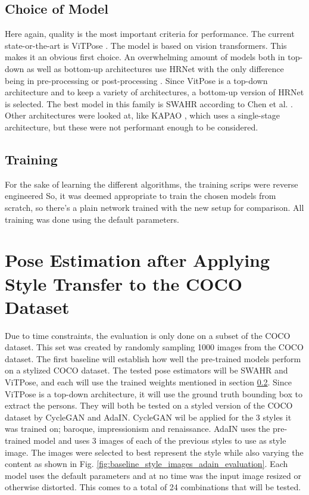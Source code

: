 \subsection{Choice of Model}
\label{sec:baseline_choice_pose_estimation}
Here again, quality is the most important criteria for performance.
The current state-or-the-art is ViTPose \cite{xu2023}.
The model is based on vision transformers.
This makes it an obvious first choice.
An overwhelming amount of models both in top-down as well as bottom-up architectures use HRNet \cite{Sun2019} with the only difference being in pre-processing \cite{Zhang2019} \cite{Huang2019} or post-processing \cite{Cheng2019} \cite{Geng2021}.
Since VitPose is a top-down architecture and to keep a variety of architectures, a bottom-up version of HRNet is selected.
The best model in this family is SWAHR according to Chen et al. \cite{chen2022}.
Other architectures were looked at, like KAPAO \cite{William2021}, which uses a single-stage architecture, but these were not performant enough to be considered.

\subsection{Training}
\label{sec:baseline_training_pose_estimation}
For the sake of learning the different algorithms, the training scrips were reverse engineered
So, it was deemed appropriate to train the chosen models from scratch, so there's a plain network trained with the new setup for comparison.
All training was done using the default parameters.

\section{Pose Estimation after Applying Style Transfer to the COCO Dataset}
\label{sec:baseline_coco_style_transfer}
Due to time constraints, the evaluation is only done on a subset of the COCO dataset.
This set was created by randomly sampling 1000 images from the COCO dataset.
The first baseline will establish how well the pre-trained models perform on a stylized COCO dataset.
The tested pose estimators will be SWAHR and ViTPose, and each will use the trained weights mentioned in section \ref{sec:baseline_training_pose_estimation}.
Since ViTPose is a top-down architecture, it will use the ground truth bounding box to extract the persons.
They will both be tested on a styled version of the COCO dataset by CycleGAN and AdaIN.
CycleGAN wil be applied for the 3 styles it was trained on; baroque, impressionism and renaissance.
AdaIN uses the pre-trained model and uses 3 images of each of the previous styles to use as style image.
The images were selected to best represent the style while also varying the content as shown in Fig. \ref{fig:baseline_style_images_adain_evaluation}.
Each model uses the default parameters and at no time was the input image resized or otherwise distorted.
This comes to a total of 24 combinations that will be tested.

